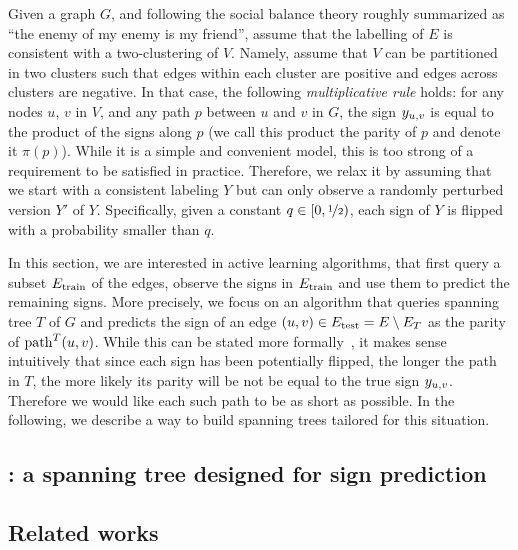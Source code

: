 \documentclass[nobib, a4paper, 10pt, oneside, onecolumn, openany, notitlepage, final,
svgnames, marginals=raggedouter, english,
]{article}
\begin{document}


Given a graph $G$, and following the social balance theory roughly summarized as \enquote{the enemy
of my enemy is my friend}, assume that the labelling of $E$ is consistent with a two-clustering of
$V$. Namely, assume that $V$ can be partitioned in two clusters such that edges within each cluster
are positive and edges across clusters are negative. In that case, the following
\emph{multiplicative rule} holds: for any nodes $u$, $v$ in $V$, and any path $p$ between $u$ and
$v$ in $G$, the sign $y_{u, v}$ is equal to the product of the signs along $p$ (we call this product the
parity of $p$ and denote it $\pi(p)$). While it is a simple and convenient model, this is too strong
of a requirement to be satisfied in practice. Therefore, we relax it by assuming that we start with
a consistent labeling $Y$ but can only observe a randomly perturbed version $Y'$ of $Y$.
Specifically, given a constant $q\in [0, \nicefrac{1}{2})$, each sign of $Y$ is flipped with a
probability smaller than $q$.

In this section, we are interested in active learning algorithms, that first query a subset
$E_{\mathrm{train}}$ of the edges, observe the signs in $E_{\mathrm{train}}$ and use them to predict the remaining signs.
More precisely, we focus on an algorithm that queries spanning tree $T$ of $G$ and predicts the sign
of an edge $(u,v) \in E_{\mathrm{test}} = E \setminus E_T$ as the parity of $\operatorname{path}^T(u, v)$. While this
can be stated more formally~\autocite[Section
4.1]{Cesa-Bianchi2012b}, it makes sense intuitively that since each sign has been potentially
flipped, the longer the path in $T$, the more likely its parity will be not be equal to the true
sign $y_{u, v}{}$. Therefore we would like each such path to be as short as possible. In the following,
we describe a way to build spanning trees tailored for this situation.

\subsection{\gtx{}: a spanning tree designed for sign prediction}
\label{sub:gtx_a_simple_low_stretch_tree_construction}

% 

\subsection{Related works}
\label{sub:gtx_related_works}
\end{document}
